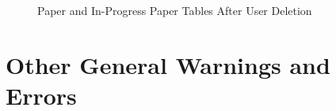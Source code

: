 \documentclass[12pt, a4paper, titlepage]{book}
\begin{document}
\begin{appendices}
\begin{figure}[H]
    \qquad
    \caption{Paper and In-Progress Paper Tables After User Deletion}
 \end{figure}

\chapter{Other General Warnings and Errors}


\end{appendices}
\normalsize
\listoffigures
\end{document}
